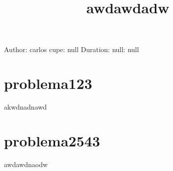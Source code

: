 \documentclass{article}
\title{
awdawdadw }
\begin{document}
 
\maketitle 
Author: carlos cupe\breakCourse : null\hspace{1cm} Duration: null\breakIndicactions: 
null\break\section{ problema123 } 
akwdnadnawd\section{ problema2543 } 
awdawdnaodw
\end{document}
